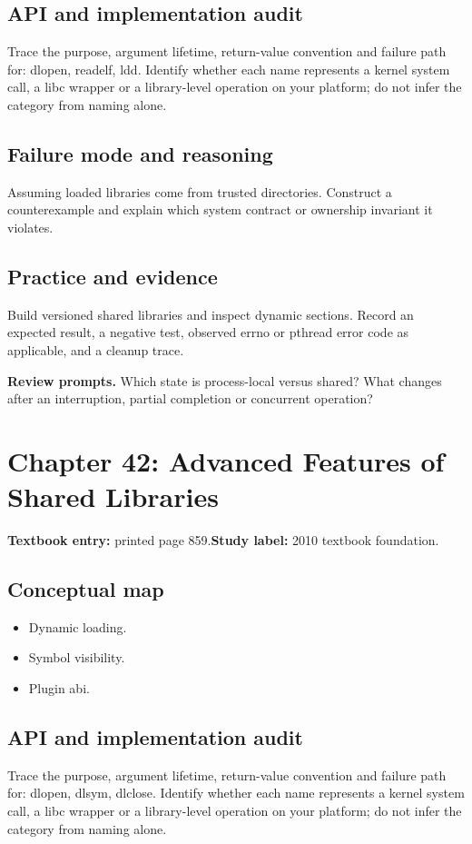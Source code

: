 \documentclass[11pt,letterpaper,oneside]{report}
\begin{document}
\subsection{API and implementation audit}
Trace the purpose, argument lifetime, return-value convention and failure path for: dlopen, readelf, ldd. Identify whether each name represents a kernel system call, a libc wrapper or a library-level operation on your platform; do not infer the category from naming alone.

\subsection{Failure mode and reasoning}
Assuming loaded libraries come from trusted directories. Construct a counterexample and explain which system contract or ownership invariant it violates.

\subsection{Practice and evidence}
Build versioned shared libraries and inspect dynamic sections. Record an expected result, a negative test, observed errno or pthread error code as applicable, and a cleanup trace.

\textbf{Review prompts.} Which state is process-local versus shared? What changes after an interruption, partial completion or concurrent operation?

\section{Chapter 42: Advanced Features of Shared Libraries}
\textbf{Textbook entry:} printed page 859.\quad \textbf{Study label:} 2010 textbook foundation.

\subsection{Conceptual map}
\begin{itemize}
\item Dynamic loading.
\item Symbol visibility.
\item Plugin abi.
\end{itemize}
\subsection{API and implementation audit}
Trace the purpose, argument lifetime, return-value convention and failure path for: dlopen, dlsym, dlclose. Identify whether each name represents a kernel system call, a libc wrapper or a library-level operation on your platform; do not infer the category from naming alone.
\end{document}
